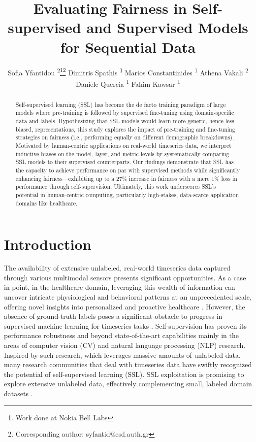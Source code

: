 \documentclass[letterpaper]{article} %
\title{Evaluating Fairness in Self-supervised and Supervised Models for Sequential Data}
\author{
    Sofia Yfantidou \textsuperscript{\rm 2}\thanks{Work done at Nokia Bell Labs}\footnote{Corresponding author: syfantid@csd.auth.gr}
    Dimitris Spathis \textsuperscript{\rm 1}
    Marios Constantinides \textsuperscript{\rm 1}
    Athena Vakali \textsuperscript{\rm 2}
    Daniele Quercia \textsuperscript{\rm 1}
    Fahim Kawsar \textsuperscript{\rm 1}
}
\begin{document}
\maketitle

\begin{abstract}
Self-supervised learning (SSL) has become the de facto training paradigm of large models where pre-training is followed by supervised fine-tuning using domain-specific data and labels.
Hypothesizing that SSL models would learn more generic, hence less biased, representations, this study explores the impact of pre-training and fine-tuning strategies on fairness (i.e., performing equally on different demographic breakdowns).
Motivated by human-centric applications on real-world timeseries data, we interpret inductive biases on the model, layer, and metric levels by systematically comparing SSL models to their supervised counterparts. Our findings demonstrate that SSL has the capacity to achieve performance on par with supervised methods while significantly enhancing fairness---exhibiting up to a 27\% increase in fairness with a mere 1\% loss in performance through self-supervision. Ultimately, this work underscores SSL's potential in human-centric computing, particularly high-stakes, data-scarce application domains like healthcare.
\end{abstract}

\section{Introduction\label{introduction}}
The availability of extensive unlabeled, real-world timeseries data captured through various multimodal sensors presents significant opportunities. As a case in point, in the healthcare domain, leveraging this wealth of information can uncover intricate physiological and behavioral patterns at an unprecedented scale, offering novel insights into personalized and proactive healthcare \cite{perez2021wearables}.
However, the absence of ground-truth labels poses a significant obstacle to progress in supervised machine learning for timeseries tasks \cite{spathis2022breaking}. 
Self-supervision has proven its performance robustness and beyond state-of-the-art capabilities mainly in the areas of computer vision (CV) \cite{chen2020simple} and natural language processing (NLP) \cite{devlin2018bert} research. Inspired by such research, which leverages massive amounts of unlabeled data, many research communities that deal with timeseries data have swiftly recognized the potential of self-supervised learning (SSL). SSL exploitation is promising to explore extensive unlabeled data, effectively complementing small, labeled domain datasets \cite{tang2020exploring}.
\end{document}
